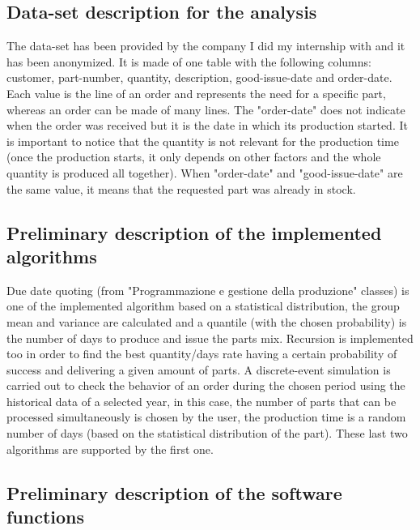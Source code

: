 \documentclass[a4paper,12pt]{article}
\begin{document}
\subsection{Data-set description for the analysis}

The data-set has been provided by the company I did my internship with and it has been anonymized. It is made of one table with the following columns: customer, part-number, quantity, description, good-issue-date and order-date. Each value is the line of an order and represents the need for a specific part, whereas an order can be made of many lines. The "order-date" does not indicate when the order was received but it is the date in which its production started. It is important to notice that the quantity is not relevant for the production time (once the production starts, it only depends on other factors and the whole quantity is produced all together). When "order-date" and "good-issue-date" are the same value, it means that the requested part was already in stock.

\subsection{Preliminary description of the implemented algorithms}

Due date quoting (from "Programmazione e gestione della produzione" classes) is one of the implemented algorithm based on a statistical distribution, the group mean and variance are calculated and a quantile (with the chosen probability) is the number of days to produce and issue the parts mix. Recursion is implemented too in order to find the best quantity/days rate having a certain probability of success and delivering a given amount of parts. A discrete-event simulation is carried out to check the behavior of an order during the chosen period using the historical data of a selected year, in this case, the number of parts that can be processed simultaneously is chosen by the user, the production time is a random number of days (based on the statistical distribution of the part). These last two algorithms are supported by the first one.

\subsection{Preliminary description of the software functions} 
\end{document}
